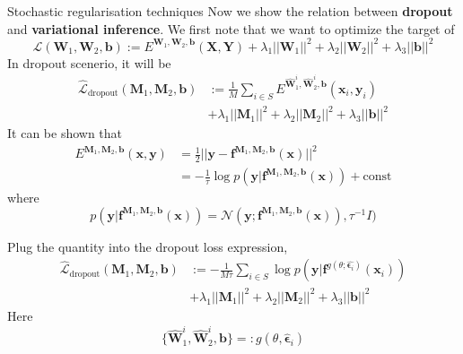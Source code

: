 \documentclass{beamer}
\begin{document}
\begin{frame}[allowframebreaks]{Stochastic regularisation techniques}
\framebreak
Now we show the relation between \textbf{dropout} and \textbf{variational inference}. We first note that we want to optimize the target of 
$$\mathcal{L}(\mathbf{W}_1, \mathbf{W}_2, \mathbf{b}) := E^{\mathbf{W}_1, \mathbf{W}_2, \mathbf{b}}(\mathbf{X}, \mathbf{Y}) + \lambda_1 || \mathbf{W}_1||^2 + \lambda_2 || \mathbf{W}_2||^2 + \lambda_3 ||\mathbf{b}||^2$$
In dropout scenerio, it will be 
\begin{align*}
\hat{\mathcal{L}}_{\text{dropout}}(\mathbf{M}_1, \mathbf{M}_2, \mathbf{b}) & := \frac{1}{M} \sum_{i \in S}E^{\hat{\mathbf{W}}^i_1, \hat{\mathbf{W}}^i_2, \mathbf{b}}(\mathbf{x}_i, \mathbf{y}_i) \\
& + \lambda_1 || \mathbf{M}_1||^2 + \lambda_2 || \mathbf{M}_2||^2 + \lambda_3 ||\mathbf{b}||^2
\end{align*}
It can be shown that 
\begin{align*}
E^{\mathbf{M}_1, \mathbf{M}_2, \mathbf{b}}(\mathbf{x}, \mathbf{y}) & = \frac{1}{2} || \mathbf{y} - \mathbf{f}^{\mathbf{M}_1, \mathbf{M}_2, \mathbf{b}}(\mathbf{x})||^2 \\
& = - \frac{1}{\tau} \log p(\mathbf{y} | \mathbf{f}^{\mathbf{M}_1, \mathbf{M}_2, \mathbf{b}}(\mathbf{x})) + \text{const}
\end{align*}
where $$p(\mathbf{y} | \mathbf{f}^{\mathbf{M}_1, \mathbf{M}_2, \mathbf{b}}(\mathbf{x})) = \mathcal{N}(\mathbf{y} ; \mathbf{f}^{\mathbf{M}_1, \mathbf{M}_2, \mathbf{b}}(\mathbf{x})), \tau^{-1} I)$$

\framebreak
Plug the quantity into the dropout loss expression,
\begin{align*}
\hat{\mathcal{L}}_{\text{dropout}}(\mathbf{M}_1, \mathbf{M}_2, \mathbf{b}) & := -\frac{1}{M \tau}  \sum_{i \in S}\log p(\mathbf{y} | \mathbf{f}^{g(\theta; \hat{\bm{\epsilon}_i})}(\mathbf{x}_i))  \\
    & + \lambda_1 || \mathbf{M}_1||^2 + \lambda_2 || \mathbf{M}_2||^2 + \lambda_3 ||\mathbf{b}||^2
\end{align*}
Here $$\{ \hat{\mathbf{W}}_1^i, \hat{\mathbf{W}}_2^i, \mathbf{b} \} =: g(\theta, \hat{\bm{\epsilon}}_i)$$


\end{frame}
\end{document}
